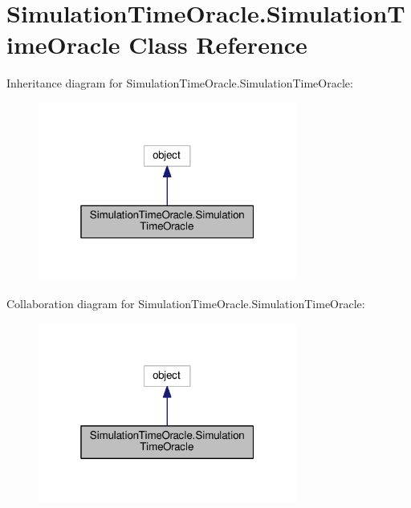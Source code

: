 \hypertarget{class_simulation_time_oracle_1_1_simulation_time_oracle}{}\section{Simulation\+Time\+Oracle.\+Simulation\+Time\+Oracle Class Reference}
\label{class_simulation_time_oracle_1_1_simulation_time_oracle}


Inheritance diagram for Simulation\+Time\+Oracle.\+Simulation\+Time\+Oracle\+:\nopagebreak
\begin{figure}[H]
\begin{center}
\leavevmode
\includegraphics[width=241pt]{class_simulation_time_oracle_1_1_simulation_time_oracle__inherit__graph}
\end{center}
\end{figure}


Collaboration diagram for Simulation\+Time\+Oracle.\+Simulation\+Time\+Oracle\+:\nopagebreak
\begin{figure}[H]
\begin{center}
\leavevmode
\includegraphics[width=241pt]{class_simulation_time_oracle_1_1_simulation_time_oracle__coll__graph}
\end{center}
\end{figure}
